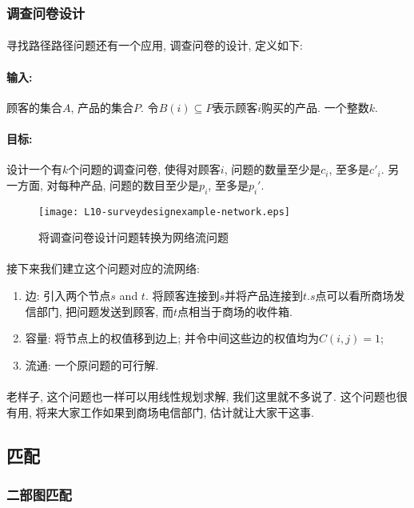 \documentclass[a4paper]{article}
\begin{document}
        \subsubsection{调查问卷设计}
            \paragraph{}寻找路径路径问题还有一个应用, 调查问卷的设计, 定义如下:
            \paragraph{输入:} 顾客的集合$A$, 产品的集合$P$. 令$B(i) \subseteq P$表示顾客$i$购买的产品. 一个整数$k$.
            \paragraph{目标:} 设计一个有$k$个问题的调查问卷, 使得对顾客$i$, 问题的数量至少是$c_i$, 至多是$c'_i$. 另一方面, 对每种产品, 问题的数目至少是$p_i$, 至多是$p_i'$.
        \begin{figure}[h]
            \centering
            \texttt{[image: L10-surveydesignexample-network.eps]}
            \caption{将调查问卷设计问题转换为网络流问题}
            \label{Figure: survey_design_example_network}
        \end{figure}
        \paragraph{} 接下来我们建立这个问题对应的流网络:
        \begin{enumerate}
 \item 边: 引入两个节点$s$ and $t$. 将顾客连接到$s$并将产品连接到$t$.$s$点可以看所商场发信部门, 把问题发送到顾客, 而$t$点相当于商场的收件箱.
 \item 容量: 将节点上的权值移到边上; 并令中间这些边的权值均为$C(i,j)=1$;
 \item 流通: 一个原问题的可行解.
        \end{enumerate}
        \paragraph{}老样子, 这个问题也一样可以用线性规划求解, 我们这里就不多说了. 这个问题也很有用, 将来大家工作如果到商场电信部门, 估计就让大家干这事.
    \subsection{匹配}
        \subsubsection{二部图匹配}
\end{document}
